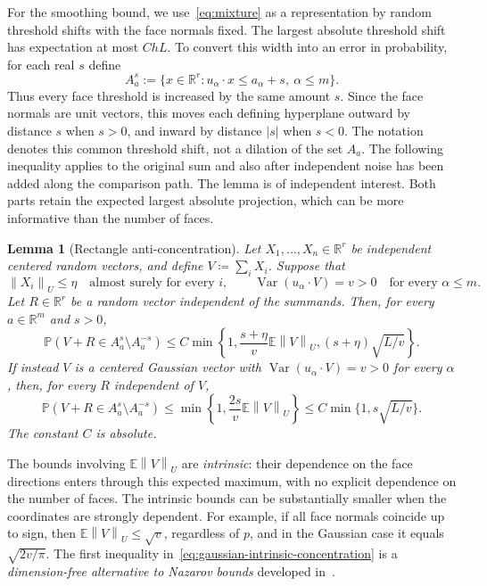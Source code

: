 \documentclass[11pt,letterpaper,twoside,leqno]{article}
\theoremstyle{bookplain}
\newtheorem{lemma}{Lemma}
\theoremstyle{bookremark}
\newcommand{\E}{\mathbb E}
\newcommand{\Pp}{\mathbb P}
\newcommand{\R}{\mathbb R}
\newcommand{\Var}{\operatorname{Var}}
\newcommand{\norm}[1]{\left\lVert#1\right\rVert}
\begin{document}
For the smoothing bound, we use~\eqref{eq:mixture} as a representation
by random threshold shifts with the face normals fixed.
The largest absolute threshold shift has expectation at most \(ChL\).
{
To convert this width into an error in probability, for each real \(s\) define
\[
 A_a^s:=\{x\in\R^r:u_\alpha\cdot x\le a_\alpha+s,\ \alpha\le m\}.
\]
Thus every face threshold is increased by the same amount \(s\).
Since the face normals are unit vectors, this moves each defining
hyperplane outward by distance \(s\) when \(s>0\), and inward by
distance \(|s|\) when \(s<0\). The notation denotes this common
threshold shift, not a dilation of the set \(A_a\).} The following inequality applies to the original sum and
also after independent noise has been added along the comparison path.
The lemma is of independent interest. Both parts retain the expected
largest absolute projection, which can be more informative than the
number of faces.

\begin{lemma}[Rectangle anti-concentration]\label{lem:concentration}
Let \(X_1,\ldots,X_n\in\R^r\) be independent centered random
vectors, and {define} \(V\coloneqq\sum_iX_i\). Suppose that
\[
 \norm{X_i}_U\le\eta\quad\text{almost surely for every }i,
 \qquad \Var(u_\alpha\cdot V)=v>0
                   \quad\text{for every }\alpha\le m.
\]
Let \(R\in\R^r\) be a random vector independent of the summands.
Then, for every \(a\in\R^m\) and \(s>0\),
\begin{equation}
 \Pp(V+R\in A_a^s\setminus A_a^{-s})
 \le C\min\left\{1,\frac{s+\eta}{v}\E\norm{V}_U,
                         (s+\eta)\sqrt{L/v}\right\}.
 \label{eq:bounded-intrinsic-concentration}
\end{equation}
If instead \(V\) is a centered Gaussian vector with
\(\Var(u_\alpha\cdot V)=v>0\) for every \(\alpha\), then, for
every \(R\) independent of \(V\),
\begin{equation}
 \Pp(V+R\in A_a^s\setminus A_a^{-s})
 \le\min\left\{1,\frac{2s}{v}\E\norm{V}_U\right\}
 \le C\min\{1,s\sqrt{L/v}\}.
 \label{eq:gaussian-intrinsic-concentration}
\end{equation}
The constant \(C\) is absolute.
\end{lemma}
The bounds involving \(\E\norm{V}_U\) are \emph{intrinsic}:
their dependence on the face directions enters through this expected
maximum, with no explicit dependence on the number of faces.
{The intrinsic bounds can be substantially smaller when the
coordinates are strongly dependent. For example, if all face normals
coincide up to sign}, then
\(\E\norm{V}_U\le\sqrt v\), regardless of \(p\), and in the
Gaussian case it equals \(\sqrt{2v/\pi}\).
The first inequality in~\eqref{eq:gaussian-intrinsic-concentration}
is a \emph{dimension-free alternative to Nazarov bounds} {developed in~\cite{ChernozhukovAC2026}.}
\end{document}

